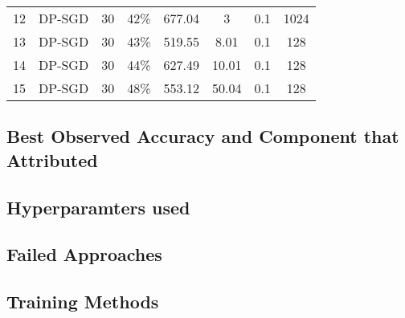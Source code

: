 \begin{table}[!ht]
{\begin{tabular}{|c|c|c|c|c|c|c|c|}
            12 & DP-SGD & 30  & 42\% & 677.04 & 3    & 0.1 & 1024 \\

            13 & DP-SGD & 30  & 43\% & 519.55 & 8.01 & 0.1 & 128  \\

            14 & DP-SGD & 30  & 44\% & 627.49 & 10.01 & 0.1 & 128  \\

            15 & DP-SGD & 30  & 48\% & 553.12 & 50.04 & 0.1 & 128  \\

           \hline

        \end{tabular}

    } %

    \label{tab:exp_results}  %

\end{table}

 




\subsection{Best Observed Accuracy and Component that Attributed}\label{subsec:best-accuracy}

\subsection{Hyperparamters used}\label{subsec:hyperparameters}

\subsection{Failed Approaches}\label{subsec:failed-approaches}

\subsection{Training Methods}\label{subsec:training-methods}